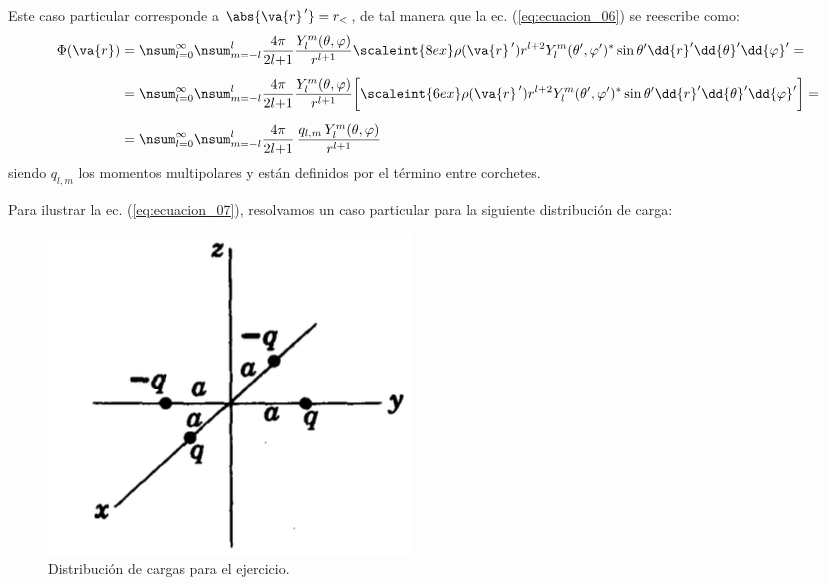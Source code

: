 Este caso particular corresponde a $\abs{\va{r}^{\, \prime}} = r_{<}$, de tal manera que la ec. (\ref{eq:ecuacion_06}) se reescribe como:
\begin{align}
\begin{aligned}
\Phi (\va{r}) &=  \nsum_{l=0}^{\infty} \nsum_{m=-l}^{l} \dfrac{4 \pi}{2 l {+} 1} \dfrac{Y_{l}^{m} (\theta, \varphi)}{r^{l+1}} \scaleint{8ex} \rho (\va{r}^{\, \prime}) r^{l+2} Y_{l}^{m} (\theta^{\prime}, \varphi^{\prime})^{*} \sin \theta^{\prime} \dd{r}^{\prime} \dd{\theta}^{\prime} \dd{\varphi}^{\prime} = \\[0.5em]
&= \nsum_{l=0}^{\infty} \nsum_{m=-l}^{l} \dfrac{4 \pi}{2 l {+} 1} \dfrac{Y_{l}^{m} (\theta, \varphi)}{r^{l+1}} \bigg[ \scaleint{6ex} \rho (\va{r}^{\, \prime}) r^{l+2} Y_{l}^{m} (\theta^{\prime}, \varphi^{\prime})^{*} \sin \theta^{\prime} \dd{r}^{\prime} \dd{\theta}^{\prime} \dd{\varphi}^{\prime} \bigg] = \\[0.5em]
&= \nsum_{l=0}^{\infty} \nsum_{m=-l}^{l} \dfrac{4 \pi}{2 l {+} 1} \, \dfrac{q_{l, m} \, Y_{l}^{m}(\theta, \varphi)}{r^{l+1}}
\end{aligned}
\label{eq:ecuacion_07}
\end{align}
siendo $q_{l,m}$ los momentos multipolares y están definidos por el término entre corchetes.
\par
Para ilustrar la ec. (\ref{eq:ecuacion_07}), resolvamos un caso particular para la siguiente distribución de carga:
\begin{figure}[H]
    \centering
    \includegraphics[scale=0.6]{Imagenes/Desarrollo_multipolar_4_cargas.png}
    \caption{Distribución de cargas para el ejercicio.}
    \label{fig:figura_02}
\end{figure}

